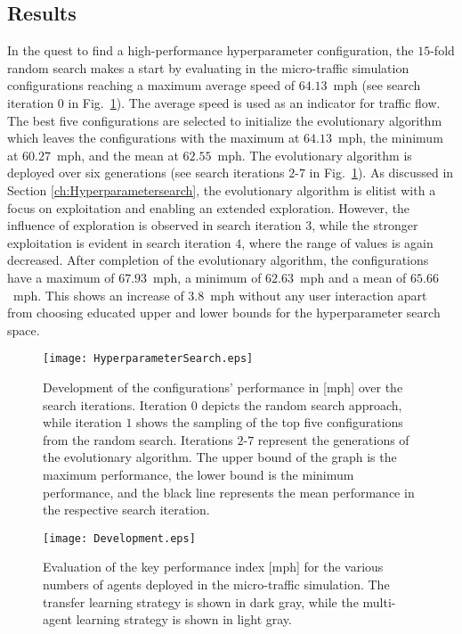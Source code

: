 \documentclass{article}
\begin{document}
\subsection{Results}

In the quest to find a high-performance hyperparameter configuration, the $15$-fold random search makes a start by evaluating in the  micro-traffic simulation configurations reaching a maximum average speed of $64.13$~mph (see search iteration $0$ in Fig.~\ref{fig:HyperparameterSearch}). The average speed is used as an indicator for traffic flow. The best five configurations are selected to initialize the evolutionary algorithm which leaves the configurations with the maximum at $64.13$~mph, the minimum at $60.27$~mph, and the mean at $62.55$~mph. The evolutionary algorithm is deployed over six generations (see search iterations $2$-$7$ in Fig.~\ref{fig:HyperparameterSearch}). As discussed in Section \ref{ch:Hyperparametersearch}, the evolutionary algorithm is elitist with a focus on exploitation and enabling an extended exploration. However, the influence of exploration is observed in search iteration $3$, while the stronger exploitation is evident in search iteration $4$, where the range of values is again decreased. After completion of the evolutionary algorithm, the configurations have a maximum of $67.93$~mph, a minimum of $62.63$~mph and a mean of $65.66$~mph. This shows an increase of $3.8$~mph without any user interaction apart from choosing educated upper and lower bounds for the hyperparameter search space.                    
\begin{figure}[ht]
	\centering
	\texttt{[image: HyperparameterSearch.eps]}
	\caption{Development of the configurations' performance in [mph] over the search iterations. Iteration $0$ depicts the random search approach, while iteration $1$ shows the sampling of the top five configurations from the random search. Iterations $2$-$7$ represent the generations of the evolutionary algorithm. The upper bound of the graph is the maximum performance, the lower bound is the minimum performance, and the black line represents the mean performance in the respective search iteration.}
	\label{fig:HyperparameterSearch}
\end{figure}



\begin{figure}[ht]
	\centering
	\texttt{[image: Development.eps]}
	
	\caption{Evaluation of the key performance index [mph] for the various numbers of agents deployed in the micro-traffic simulation. The transfer learning strategy is shown in dark gray, while the multi-agent learning strategy is shown in light gray.}
	
	\label{fig:PerformanceDevelopment}
\end{figure}
\end{document}
